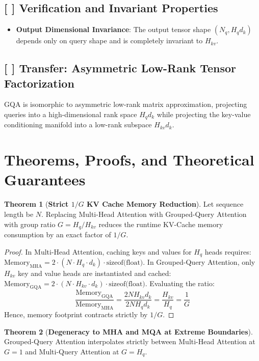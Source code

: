 \documentclass[11pt,a4paper]{article}
\theoremstyle{definition}
\newtheorem{theorem}{\textbf{Theorem}}[section]
\begin{document}
\subsection{[ ] Verification and Invariant Properties}
\begin{itemize}
    \item \textbf{Output Dimensional Invariance}: The output tensor shape $(N_q, H_q d_k)$ depends only on query shape and is completely invariant to $H_{kv}$.
\end{itemize}

\subsection{[ ] Transfer: Asymmetric Low-Rank Tensor Factorization}
GQA is isomorphic to asymmetric low-rank matrix approximation, projecting queries into a high-dimensional rank space $H_q d_k$ while projecting the key-value conditioning manifold into a low-rank subspace $H_{kv} d_k$.

\section{Theorems, Proofs, and Theoretical Guarantees}

\begin{theorem}[\textbf{Strict $1/G$ KV Cache Memory Reduction}]
Let sequence length be $N$. Replacing Multi-Head Attention with Grouped-Query Attention with group ratio $G = H_q / H_{kv}$ reduces the runtime KV-Cache memory consumption by an exact factor of $1/G$.
\end{theorem}

\begin{proof}
In Multi-Head Attention, caching keys and values for $H_q$ heads requires:
$\text{Memory}_{\text{MHA}} = 2 \cdot (N \cdot H_q \cdot d_k) \cdot \text{sizeof(float)}$.
In Grouped-Query Attention, only $H_{kv}$ key and value heads are instantiated and cached:
$\text{Memory}_{\text{GQA}} = 2 \cdot (N \cdot H_{kv} \cdot d_k) \cdot \text{sizeof(float)}$.
Evaluating the ratio:
{\boldmath
\begin{equation}
\frac{\text{Memory}_{\text{GQA}}}{\text{Memory}_{\text{MHA}}} = \frac{2 N H_{kv} d_k}{2 N H_q d_k} = \frac{H_{kv}}{H_q} = \frac{1}{G}
\end{equation}
}
Hence, memory footprint contracts strictly by $1/G$.
\end{proof}

\begin{theorem}[\textbf{Degeneracy to MHA and MQA at Extreme Boundaries}]
Grouped-Query Attention interpolates strictly between Multi-Head Attention at $G = 1$ and Multi-Query Attention at $G = H_q$.
\end{theorem}
\end{document}
